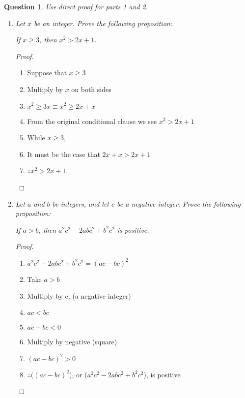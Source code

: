 \documentclass{article}
\newtheorem{question}{Question}
\begin{document}
\bigskip

\begin{question}
    Use direct proof for parts 1 and 2.
\end{question}


\begin{enumerate}
    \item \textit{Let $x$ be an integer. Prove the following proposition:} \\
      \centerline{\textit{If $x \geq 3$, then $x^2 > 2x+1$.}}
      \begin{proof}
          \begin{enumerate}
              \item Suppose that $x \geq 3$
              \item Multiply by $x$ on both sides
              \item $x^2 \geq 3x \equiv x^2 \geq 2x + x$
              \item From the original conditional clause we see $x^2 > 2x + 1$
              \item While $x \geq 3$,
              \item It must be the case that $2x + x > 2x + 1$
              \item $\therefore x^2 > 2x+1$.
          \end{enumerate}
      \end{proof}
    \item \textit{Let $a$ and $b$ be integers, and let $c$ be a negative integer. Prove the following proposition:} \\
      \centerline{\textit{If $a > b$, then $a^2c^2-2abc^2+b^2c^2$ is positive.}}
      \begin{proof}
          \begin{enumerate}
              \item $a^2c^2-2abc^2+b^2c^2 = (ac-bc)^2$
              \item Take $a > b$
              \item Multiply by c, (a negative integer)
              \item $ac < bc$
              \item $ac - bc < 0$
              \item Multiply by negative (square)
              \item $(ac - bc)^2 > 0$
              \item $\therefore ((ac-bc)^2$), or ($a^2c^2-2abc^2+b^2c^2$), is positive
          \end{enumerate}
      \end{proof}

\end{enumerate}
\end{document}
